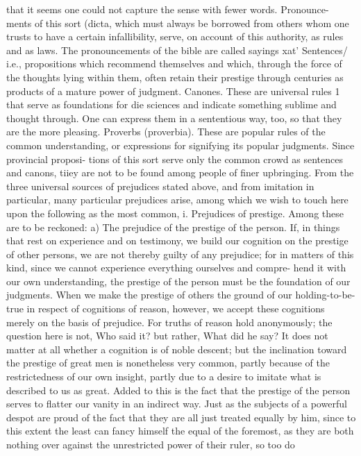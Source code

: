 that it seems one could not capture the sense with fewer words. Pronounce-
ments of this sort (dicta\), which must always be borrowed from others whom
one trusts to have a certain infallibility, serve, on account of this authority, as
rules and as laws. The pronouncements of the bible are called sayings xat'
Sentences/ i.e., propositions which recommend themselves and which,
through the force of the thoughts lying within them, often retain their prestige
through centuries as products of a mature power of judgment.
Canones. These are universal rules 1 that serve as foundations for die sciences
and indicate something sublime and thought through. One can express them
in a sententious way, too, so that they are the more pleasing.
Proverbs (proverbia). These are popular rules of the common understanding,
or expressions for signifying its popular judgments. Since provincial proposi-
tions of this sort serve only the common crowd as sentences and canons, tiiey
are not to be found among people of finer upbringing.
From the three universal sources of prejudices stated above, and from
imitation in particular, many particular prejudices arise, among which we
wish to touch here upon the following as the most common,
i. Prejudices of prestige. Among these are to be reckoned:
a) The prejudice of the prestige of the person. If, in things that rest on
experience and on testimony, we build our cognition on the prestige of
other persons, we are not thereby guilty of any prejudice; for in matters of
this kind, since we cannot experience everything ourselves and compre-
hend it with our own understanding, the prestige of the person must be
the foundation of our judgments. When we make the prestige of others
the ground of our holding-to-be-true in respect of cognitions of reason,
however, we accept these cognitions merely on the basis of prejudice. For
truths of reason hold anonymously; the question here is not, Who said it?
but rather, What did he say? It does not matter at all whether a cognition is
of noble descent; but the inclination toward the prestige of great men is
nonetheless very common, partly because of the restrictedness of our own
insight, partly due to a desire to imitate what is described to us as great.
Added to this is the fact that the prestige of the person serves to flatter our
vanity in an indirect way. Just as the subjects of a powerful despot are
proud of the fact that they are all just treated equally by him, since to this
extent the least can fancy himself the equal of the foremost, as they are
both nothing over against the unrestricted power of their ruler, so too do
